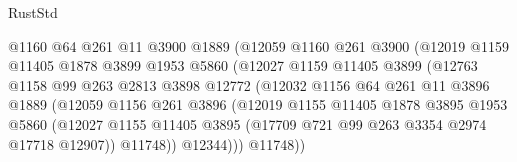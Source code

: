 \begin{lexlean}{RustStd}
\begin{coremodule}
                                  @1160
                                  @64
                                  @261
                                  @11
                                  @3900
                                  @1889
                                  (@12059
                                    @1160
                                    @261
                                    @3900
                                    (@12019
                                      @1159
                                      @11405
                                      @1878
                                      @3899
                                      @1953
                                      @5860
                                      (@12027
                                        @1159
                                        @11405
                                        @3899
                                        (@12763
                                          @1158
                                          @99
                                          @263
                                          @2813
                                          @3898
                                          @12772
                                          (@12032
                                            @1156
                                            @64
                                            @261
                                            @11
                                            @3896
                                            @1889
                                            (@12059
                                              @1156
                                              @261
                                              @3896
                                              (@12019
                                                @1155
                                                @11405
                                                @1878
                                                @3895
                                                @1953
                                                @5860
                                                (@12027
                                                  @1155
                                                  @11405
                                                  @3895
                                                  (@17709 @721 @99 @263 @3354 @2974 @17718 @12907))
                                                @11748))
                                            @12344)))
                                      @11748))

\end{coremodule}
\end{lexlean}
